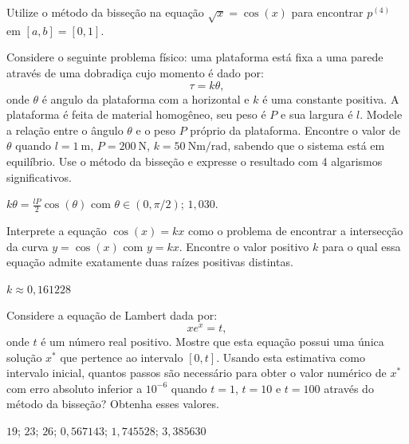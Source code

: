\documentclass[main.tex]{subfiles}
\begin{document}
\begin{Exercise}Utilize o método da bisseção na equação $\sqrt{x}=\cos(x)$ para encontrar $p^{(4)}$ em $[a,b]=[0, 1]$.
\end{Exercise}

\begin{Exercise}[title=Estática] Considere o seguinte problema físico: uma plataforma está fixa a uma parede através de uma dobradiça cujo momento é dado por:
  \begin{equation*}
    \tau=k\theta,
  \end{equation*}
onde $\theta$ é angulo da plataforma com a horizontal e $k$ é uma constante positiva. A plataforma é feita de material homogêneo, seu peso é $P$ e sua largura é $l$. Modele a relação entre o ângulo $\theta$ e o peso $P$ próprio da plataforma. Encontre o valor de $\theta$ quando $l=1~\mbox{m}$, $P=200~\mbox{N}$, $k=50~\mbox{Nm}/\mbox{rad}$, sabendo que o sistema está em equilíbrio. Use o método da bisseção e expresse o resultado com 4 algarismos significativos.
\end{Exercise}
\begin{Answer}
  \begin{tiny}
    $k\theta=\frac{lP}{2}\cos(\theta)$ com $\theta\in (0, \pi/2)$; $1,030$.
  \end{tiny}
\end{Answer}

\begin{Exercise} Interprete a equação $\cos(x)=kx$ como o problema de encontrar a intersecção da curva $y=\cos(x)$ com $y=kx$. Encontre o valor positivo $k$ para o qual essa equação admite exatamente duas raízes positivas distintas.
\end{Exercise}
\begin{Answer}
  \begin{tiny}
    $k\approx 0,161228$
  \end{tiny}
\end{Answer}

\begin{Exercise} Considere a equação de Lambert dada por:
  \begin{equation*}
    xe^x= t,
  \end{equation*}
onde $t$ é um número real positivo. Mostre que esta equação possui uma única solução $x^*$ que pertence ao intervalo $[0, t]$. Usando esta estimativa como intervalo inicial, quantos passos são necessário para obter o valor numérico de $x^*$ com erro absoluto inferior a $10^{-6}$ quando $t=1$, $t=10$ e $t=100$ através do método da bisseção? Obtenha esses valores.
\end{Exercise}
\begin{Answer}
  \begin{tiny}
    $19$; $23$; $26$; $0,567143$; $1,745528$; $3,385630$
  \end{tiny}
\end{Answer}
\end{document}
